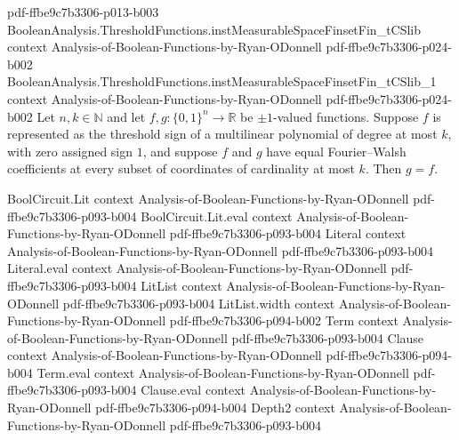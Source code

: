 \begin{theorem}
  {pdf-ffbe9c7b3306-p013-b003}
\proofstep
  {BooleanAnalysis.ThresholdFunctions.instMeasurableSpaceFinsetFin_tCSlib}
  {context}
  {Analysis-of-Boolean-Functions-by-Ryan-ODonnell}
  {pdf-ffbe9c7b3306-p024-b002}
\proofstep
  {BooleanAnalysis.ThresholdFunctions.instMeasurableSpaceFinsetFin_tCSlib_1}
  {context}
  {Analysis-of-Boolean-Functions-by-Ryan-ODonnell}
  {pdf-ffbe9c7b3306-p024-b002}
Let $n,k\in\mathbb N$ and let $f,g:\{0,1\}^n\to\mathbb R$ be $\pm1$-valued functions.
Suppose $f$ is represented as the threshold sign of a multilinear polynomial of degree
at most $k$, with zero assigned sign $1$, and suppose $f$ and $g$ have equal
Fourier–Walsh coefficients at every subset of coordinates of cardinality at most $k$.
Then $g=f$.
\end{theorem}

\begin{theorem}
\leanok
{}
\proofstep
  {BoolCircuit.Lit}
  {context}
  {Analysis-of-Boolean-Functions-by-Ryan-ODonnell}
  {pdf-ffbe9c7b3306-p093-b004}
\proofstep
  {BoolCircuit.Lit.eval}
  {context}
  {Analysis-of-Boolean-Functions-by-Ryan-ODonnell}
  {pdf-ffbe9c7b3306-p093-b004}
\proofstep
  {Literal}
  {context}
  {Analysis-of-Boolean-Functions-by-Ryan-ODonnell}
  {pdf-ffbe9c7b3306-p093-b004}
\proofstep
  {Literal.eval}
  {context}
  {Analysis-of-Boolean-Functions-by-Ryan-ODonnell}
  {pdf-ffbe9c7b3306-p093-b004}
\proofstep
  {LitList}
  {context}
  {Analysis-of-Boolean-Functions-by-Ryan-ODonnell}
  {pdf-ffbe9c7b3306-p093-b004}
\proofstep
  {LitList.width}
  {context}
  {Analysis-of-Boolean-Functions-by-Ryan-ODonnell}
  {pdf-ffbe9c7b3306-p094-b002}
\proofstep
  {Term}
  {context}
  {Analysis-of-Boolean-Functions-by-Ryan-ODonnell}
  {pdf-ffbe9c7b3306-p093-b004}
\proofstep
  {Clause}
  {context}
  {Analysis-of-Boolean-Functions-by-Ryan-ODonnell}
  {pdf-ffbe9c7b3306-p094-b004}
\proofstep
  {Term.eval}
  {context}
  {Analysis-of-Boolean-Functions-by-Ryan-ODonnell}
  {pdf-ffbe9c7b3306-p093-b004}
\proofstep
  {Clause.eval}
  {context}
  {Analysis-of-Boolean-Functions-by-Ryan-ODonnell}
  {pdf-ffbe9c7b3306-p094-b004}
\proofstep
  {Depth2}
  {context}
  {Analysis-of-Boolean-Functions-by-Ryan-ODonnell}
  {pdf-ffbe9c7b3306-p093-b004}

\end{theorem}

